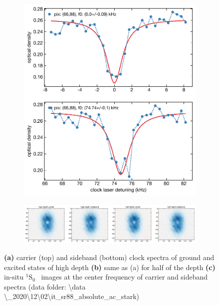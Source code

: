\documentclass[bibnotes]{article}
\newcommand{\SLJ}[3]{{\ensuremath{{^{#1}}\mathrm{#2}_{#3}}}}
\newcommand{\SSZ}{\SLJ{1}{S}{0} \ }
\begin{document}
\begin{figure}
\begin{subfigure}[b]{0.4\linewidth}
				\includegraphics[scale=0.5]{figures/half_depth66_88.pdf}
				\caption{}
			\end{subfigure}

			\begin{subfigure}{\linewidth}
				\includegraphics[scale=0.4]{figures/insitu_images.pdf}
				\caption{}
			\end{subfigure}
			\caption{\textbf{(a)} carrier (top) and sideband (bottom) clock spectra of ground and excited states of high depth \textbf{(b)} same as (a) for half of the depth \textbf{(c)} in-situ \SSZ images at the center frequency of carrier and sideband spectra (data folder: \textbackslash data \textbackslash\_2020\textbackslash12\textbackslash02\textbackslash it\_sr88\_absolute\_ac\_stark)} 
			\label{fig:total_ac_stark_spectrum}

			\end{figure}
\end{document}
